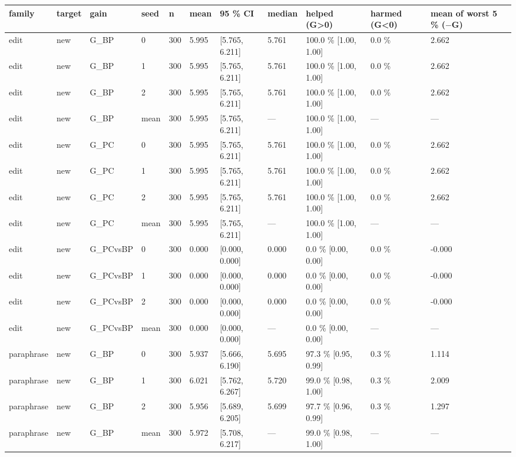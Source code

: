 \documentclass[10pt,a4paper]{article}
\begin{document}
\begin{center}\tiny
\begin{tabularx}{\textwidth}{@{}p{}XXXXXXXXXX@{}}
\toprule
family & target & gain & seed & n & mean & 95 \% CI & median & helped (G>0) & harmed (G<0) & mean of worst 5 \% ($-$G) \\ \midrule
edit & new & G\_BP & 0 & 300 & 5.995 & [5.765, 6.211] & 5.761 & 100.0 \% [1.00, 1.00] & 0.0 \% & 2.662 \\
edit & new & G\_BP & 1 & 300 & 5.995 & [5.765, 6.211] & 5.761 & 100.0 \% [1.00, 1.00] & 0.0 \% & 2.662 \\
edit & new & G\_BP & 2 & 300 & 5.995 & [5.765, 6.211] & 5.761 & 100.0 \% [1.00, 1.00] & 0.0 \% & 2.662 \\
edit & new & G\_BP & mean & 300 & 5.995 & [5.765, 6.211] & — & 100.0 \% [1.00, 1.00] & — & — \\
edit & new & G\_PC & 0 & 300 & 5.995 & [5.765, 6.211] & 5.761 & 100.0 \% [1.00, 1.00] & 0.0 \% & 2.662 \\
edit & new & G\_PC & 1 & 300 & 5.995 & [5.765, 6.211] & 5.761 & 100.0 \% [1.00, 1.00] & 0.0 \% & 2.662 \\
edit & new & G\_PC & 2 & 300 & 5.995 & [5.765, 6.211] & 5.761 & 100.0 \% [1.00, 1.00] & 0.0 \% & 2.662 \\
edit & new & G\_PC & mean & 300 & 5.995 & [5.765, 6.211] & — & 100.0 \% [1.00, 1.00] & — & — \\
edit & new & G\_PCvsBP & 0 & 300 & 0.000 & [0.000, 0.000] & 0.000 & 0.0 \% [0.00, 0.00] & 0.0 \% & -0.000 \\
edit & new & G\_PCvsBP & 1 & 300 & 0.000 & [0.000, 0.000] & 0.000 & 0.0 \% [0.00, 0.00] & 0.0 \% & -0.000 \\
edit & new & G\_PCvsBP & 2 & 300 & 0.000 & [0.000, 0.000] & 0.000 & 0.0 \% [0.00, 0.00] & 0.0 \% & -0.000 \\
edit & new & G\_PCvsBP & mean & 300 & 0.000 & [0.000, 0.000] & — & 0.0 \% [0.00, 0.00] & — & — \\
paraphrase & new & G\_BP & 0 & 300 & 5.937 & [5.666, 6.190] & 5.695 & 97.3 \% [0.95, 0.99] & 0.3 \% & 1.114 \\
paraphrase & new & G\_BP & 1 & 300 & 6.021 & [5.762, 6.267] & 5.720 & 99.0 \% [0.98, 1.00] & 0.3 \% & 2.009 \\
paraphrase & new & G\_BP & 2 & 300 & 5.956 & [5.689, 6.205] & 5.699 & 97.7 \% [0.96, 0.99] & 0.3 \% & 1.297 \\
paraphrase & new & G\_BP & mean & 300 & 5.972 & [5.708, 6.217] & — & 99.0 \% [0.98, 1.00] & — & — \\

\end{tabularx}
\end{center}
\end{document}
